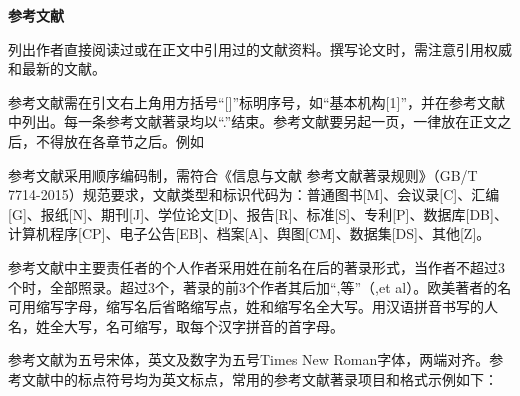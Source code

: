 \newpage
\begin{center}
    \sanhao\heiti
    \textbf{参考文献}    
\end{center}
列出作者直接阅读过或在正文中引用过的文献资料。撰写论文时，需注意引用权威和最新的文献。

参考文献需在引文右上角用方括号“[]”标明序号，如“基本机构[1]”，并在参考文献中列出。每一条参考文献著录均以“.”结束。参考文献要另起一页，一律放在正文之后，不得放在各章节之后。例如\cite{example1}

参考文献采用顺序编码制，需符合《信息与文献 参考文献著录规则》（GB/T 7714-2015）规范要求，文献类型和标识代码为：普通图书[M]、会议录[C]、汇编[G]、报纸[N]、期刊[J]、学位论文[D]、报告[R]、标准[S]、专利[P]、数据库[DB]、计算机程序[CP]、电子公告[EB]、档案[A]、舆图[CM]、数据集[DS]、其他[Z]。

参考文献中主要责任者的个人作者采用姓在前名在后的著录形式，当作者不超过3个时，全部照录。超过3个，著录的前3个作者其后加“,等”（,et al）。欧美著者的名可用缩写字母，缩写名后省略缩写点，姓和缩写名全大写。用汉语拼音书写的人名，姓全大写，名可缩写，取每个汉字拼音的首字母。

参考文献为五号宋体，英文及数字为五号Times New Roman字体，两端对齐。参考文献中的标点符号均为英文标点，常用的参考文献著录项目和格式示例如下：



